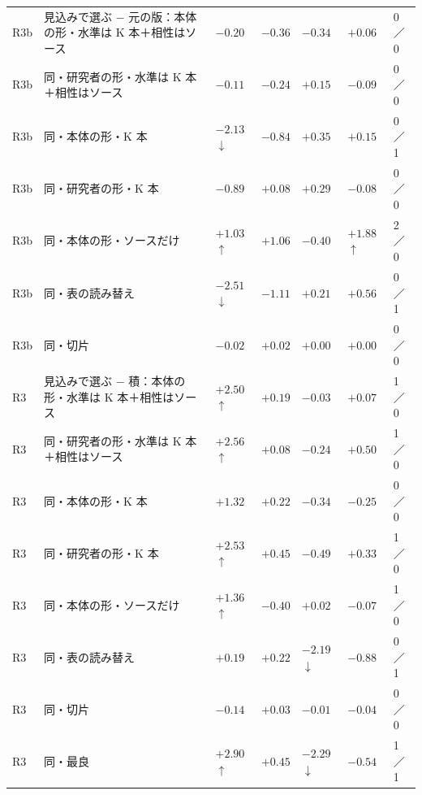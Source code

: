 \begin{longtable}{>{\raggedright}p{0.75cm}>{\raggedright}p{5.6cm}>{\raggedright}p{2.05cm}>{\raggedright}p{2.05cm}>{\raggedright}p{2.05cm}>{\raggedright}p{2.05cm}p{0.75cm}}
R3b & 見込みで選ぶ $-$ 元の版：本体の形・水準は K 本＋相性はソース & $-0.20$ & $-0.36$ & $-0.34$ & $+0.06$ & 0／0 \\
R3b & 同・研究者の形・水準は K 本＋相性はソース & $-0.11$ & $-0.24$ & $+0.15$ & $-0.09$ & 0／0 \\
R3b & 同・本体の形・K 本 & $-2.13$$\downarrow$ & $-0.84$ & $+0.35$ & $+0.15$ & 0／1 \\
R3b & 同・研究者の形・K 本 & $-0.89$ & $+0.08$ & $+0.29$ & $-0.08$ & 0／0 \\
R3b & 同・本体の形・ソースだけ & $+1.03$$\uparrow$ & $+1.06$ & $-0.40$ & $+1.88$$\uparrow$ & 2／0 \\
R3b & 同・表の読み替え & $-2.51$$\downarrow$ & $-1.11$ & $+0.21$ & $+0.56$ & 0／1 \\
R3b & 同・切片 & $-0.02$ & $+0.02$ & $+0.00$ & $+0.00$ & 0／0 \\
R3 & 見込みで選ぶ $-$ 積：本体の形・水準は K 本＋相性はソース & $+2.50$$\uparrow$ & $+0.19$ & $-0.03$ & $+0.07$ & 1／0 \\
R3 & 同・研究者の形・水準は K 本＋相性はソース & $+2.56$$\uparrow$ & $+0.08$ & $-0.24$ & $+0.50$ & 1／0 \\
R3 & 同・本体の形・K 本 & $+1.32$ & $+0.22$ & $-0.34$ & $-0.25$ & 0／0 \\
R3 & 同・研究者の形・K 本 & $+2.53$$\uparrow$ & $+0.45$ & $-0.49$ & $+0.33$ & 1／0 \\
R3 & 同・本体の形・ソースだけ & $+1.36$$\uparrow$ & $-0.40$ & $+0.02$ & $-0.07$ & 1／0 \\
R3 & 同・表の読み替え & $+0.19$ & $+0.22$ & $-2.19$$\downarrow$ & $-0.88$ & 0／1 \\
R3 & 同・切片 & $-0.14$ & $+0.03$ & $-0.01$ & $-0.04$ & 0／0 \\
R3 & 同・最良 & $+2.90$$\uparrow$ & $+0.45$ & $-2.29$$\downarrow$ & $-0.54$ & 1／1 \\
\end{longtable}
